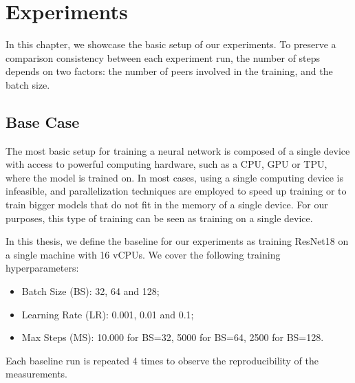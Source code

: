 \chapter{Experiments}\label{chapter:experiments}

In this chapter, we showcase the basic setup of our experiments.
To preserve a comparison consistency between each experiment run, the number of steps depends on two factors: the number of peers involved in the training, and the batch size.

\section{Base Case}
The most basic setup for training a neural network is composed of a single device with access to powerful computing hardware, such as a CPU, GPU or TPU, where the model is trained on.
In most cases, using a single computing device is infeasible, and parallelization techniques are employed to speed up training or to train bigger models that do not fit in the memory of a single device.
For our purposes, this type of training can be seen as training on a single device.

In this thesis, we define the baseline for our experiments as training ResNet18 on a single machine with 16 vCPUs.
We cover the following training hyperparameters:
\begin{itemize}
    \item Batch Size (BS): 32, 64 and 128;
    \item Learning Rate (LR): 0.001, 0.01 and 0.1;
    \item Max Steps (MS): 10.000 for BS=32, 5000 for BS=64, 2500 for BS=128.
\end{itemize}
Each baseline run is repeated 4 times to observe the reproducibility of the measurements.

